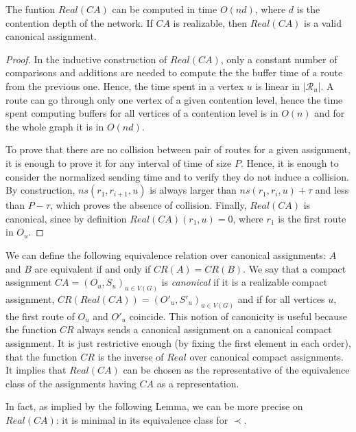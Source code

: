 \documentclass[english]{article}
\begin{document}
\begin{lemma}\label{lemma:canonical}
The funtion $Real(CA)$ can be computed in time $O(nd)$, where $d$ is the contention
depth of the network. If $CA$ is realizable, then $Real(CA)$ is a valid canonical assignment.
\end{lemma}
\begin{proof}
In the inductive construction of $Real(CA)$,  only a constant number of comparisons and additions are needed to compute the 
the buffer time of a route from the previous one. Hence, the time spent in a vertex $u$ is linear in $|\mathcal{R}_u|$. 
A route can go through only one vertex of a given contention level, hence the time spent computing buffers for all vertices
of a contention level is in $O(n)$ and for the whole graph it is in $O(nd)$.

To prove that there are no collision between pair of routes for a given assignment, it is enough to 
prove it for any interval of time of size $P$. Hence, it is enough to consider the normalized sending time and to verify
they do not induce a collision. By construction,  $ns(r_1,r_{i+1},u)$ is always larger than $ns(r_1,r_{i},u) + \tau$ and less 
than $P - \tau$, which proves the absence of collision. Finally, $Real(CA)$ is canonical, since by definition $Real(CA)(r_1,u) = 0$,
where $r_1$ is the first route in $O_u$.
\end{proof}

We can define the following equivalence relation over canonical assignments: $A$ and $B$ are equivalent if and only if $CR(A) = CR(B)$.
We say that a compact assignment $CA = (O_u,S_u)_{u \in V(G)}$ is \emph{canonical} if it is a realizable compact assignment, $CR(Real(CA)) = (O'_u,S'_u)_{u \in V(G)}$ and if for all vertices $u$, the first route of $O_u$ and $O'_u$ coincide. This notion of canonicity is useful because the function 
$CR$ always sends a canonical assignment on a canonical compact assignment. It is just restrictive enough (by fixing the first element in each order),
that the function $CR$ is the inverse of $Real$ over canonical compact assignments. It implies that
$Real(CA)$ can be chosen as the representative of the equivalence class of the assignments having $CA$ as a representation.

In fact, as implied by the following Lemma, we can be more precise on $Real(CA)$: it is minimal in its equivalence class for $\prec$.
\end{document}

